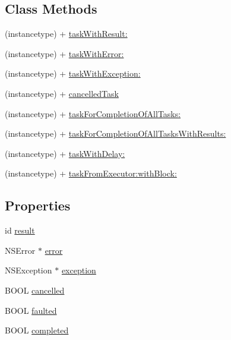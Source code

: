 \subsection*{Class Methods}
\begin{DoxyCompactItemize}
\item 
(instancetype) + \hyperlink{interface_b_f_task_a1a89407ba3e0385c315d394a51e5e1ea}{task\+With\+Result\+:}
\item 
(instancetype) + \hyperlink{interface_b_f_task_af6294f939d1f7391eb8d43019f8d7419}{task\+With\+Error\+:}
\item 
(instancetype) + \hyperlink{interface_b_f_task_ab16e7e6dc835e7bb4cb907564a61d013}{task\+With\+Exception\+:}
\item 
(instancetype) + \hyperlink{interface_b_f_task_ab08b49566c850f4688fad77834310578}{cancelled\+Task}
\item 
(instancetype) + \hyperlink{interface_b_f_task_a6e9060779200dcd7cf065eb7b8369bf4}{task\+For\+Completion\+Of\+All\+Tasks\+:}
\item 
(instancetype) + \hyperlink{interface_b_f_task_ab054e692c68c8e83f73f2f8d6af46bb8}{task\+For\+Completion\+Of\+All\+Tasks\+With\+Results\+:}
\item 
(instancetype) + \hyperlink{interface_b_f_task_a94918174b80126af993dfcb595c78a7b}{task\+With\+Delay\+:}
\item 
(instancetype) + \hyperlink{interface_b_f_task_abb1d5df203902da74b05929e4904fa91}{task\+From\+Executor\+:with\+Block\+:}
\end{DoxyCompactItemize}
\subsection*{Properties}
\begin{DoxyCompactItemize}
\item 
id \hyperlink{interface_b_f_task_a4b748e2af91631b135ca3e324a9fac2e}{result}
\item 
N\+S\+Error $\ast$ \hyperlink{interface_b_f_task_a9e3b5f8fc6e1754500bc7241a04c2cc6}{error}
\item 
N\+S\+Exception $\ast$ \hyperlink{interface_b_f_task_ab21a391a52929bd83d374c32c1b54ebf}{exception}
\item 
B\+O\+O\+L \hyperlink{interface_b_f_task_a0519b52112586cbfcccffca6bade7bc1}{cancelled}
\item 
B\+O\+O\+L \hyperlink{interface_b_f_task_a8b36396022612bbb109bb26e097874be}{faulted}
\item 
B\+O\+O\+L \hyperlink{interface_b_f_task_a8c0d88b65b10e8f6dd5378ad3d9bc6c3}{completed}
\end{DoxyCompactItemize}


